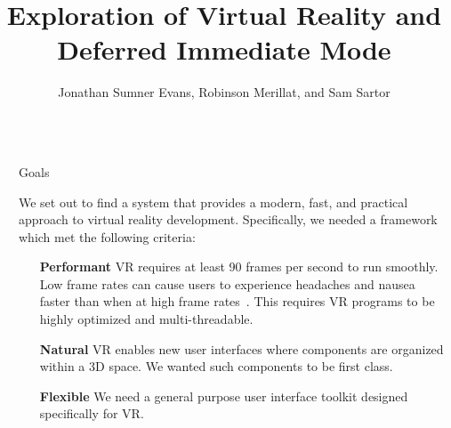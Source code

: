\documentclass[final]{beamer}
\title{Exploration of Virtual Reality and Deferred Immediate Mode}
\author{Jonathan Sumner Evans, Robinson Merillat, and Sam Sartor}
\institute{Department of Computer Science, Colorado School of Mines}
\newlength{\sepwid}
\newlength{\onecolwid}
\begin{document}

    \setlength{\belowcaptionskip}{2ex} %
    \setlength\belowdisplayshortskip{2ex} %

    \begin{frame}[t] %
        \begin{columns}[t]
            \begin{column}{\sepwid}\end{column} %

            \begin{column}{\onecolwid} %

                \begin{block}{Goals}

                    We set out to find a system that provides a modern, fast,
                    and practical approach to virtual reality development.
                    Specifically, we needed a framework which met the
                    following criteria:

                    \begin{enumerate}[leftmargin=8.75cm, labelsep=1cm]

                        \item[\textbf{Performant}] VR requires at least 90
                            frames per second to run smoothly. Low frame rates
                            can cause users to experience headaches and nausea
                            faster than when at high frame rates~\cite{irisVR}.
                            This requires VR programs to be highly optimized and
                            multi-threadable.

                        \item[\textbf{Natural}] VR enables new user interfaces
                            where components are organized within a 3D space. We
                            wanted such components to be first class.

                        \item[\textbf{Flexible}] We need a general purpose user
                            interface toolkit designed specifically for VR.


\end{enumerate}
\end{block}
\end{column}
\end{columns}
\end{frame}
\end{document}
